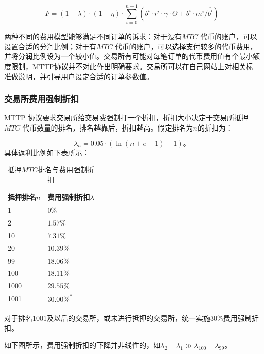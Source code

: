 \documentclass[UTF8,nofonts]{ctexart}
\begin{document}
\begin{equation*}
F =(1-\lambda)\cdot (1-\eta) \cdot  \sum^{n-1}_{i=0} (b^i \cdot r^i \cdot \gamma \cdot \Theta + b^i \cdot m^i  / \overline{b^i})
\end{equation*}


两种不同的费用模型能够满足不同订单的诉求：对于没有$MTC$ 代币的账户，可以设置合适的分润比例；对于有$MTC$ 代币的账户，可以选择支付较多的代币费用，并将分润比例设为一个较小值。交易所有可能对每笔订单的代币费用值有个最小额度限制，MTTP协议并不对此作出明确要求。交易所可以在自己网站上对相关标准做说明，并引导用户设定合适的订单参数值。

\subsubsection{交易所费用强制折扣}
MTTP 协议要求交易所给交易费强制打一个折扣，折扣大小决定于交易所抵押$MTC$ 代币数量的排名，排名越靠后，折扣越高。假定排名为$n$的折扣为：

$$\lambda_{n} = 0.05\cdot(\ln (n+e-1) - 1)\text{。}$$
具体返利比例如下表所示：


\begin{table}[hbt]
  \centering
\begin{tabular}{p{3.5cm}|p{3cm}} %
抵押排名$n$ & 费用强制折扣$\lambda$ \\ %
    \hline
1 & 0\%\\
\hline
2 & $1.57\%$\\
\hline
10 & $7.31\%$\\
\hline
20 & $10.39\%$\\
\hline
99 &$18.06\%$\\
\hline
100 &$18.11\%$\\
\hline
1000 &$29.55\%$\\
\hline
1001 &$30.00\%^*$\\
  \end{tabular}
\caption{抵押$MTC$排名与费用强制折扣} %
\end{table}


对于排名1001及以后的交易所，或未进行抵押的交易所，统一实施30\%费用强制折扣。

如下图所示，费用强制折扣的下降并非线性的，如$\lambda_{2} - \lambda_{1} \gg \lambda_{100} - \lambda_{99}$。
\end{document}
